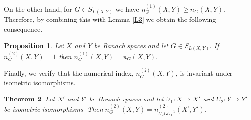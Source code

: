 \documentclass[12pt]{amsart}
\newtheorem{theorem}{Theorem}[section]
\newtheorem{proposition}[theorem]{Proposition}
\theoremstyle{definition}
\numberwithin{equation}{section}
\begin{document}
			
			
			
		
	
	
	On the other hand, for $G\in S_{ L(X, Y )}$ we have $n_G^{(1)}(X,Y)\ge n_G(X,Y).$ Therefore, by combining this with Lemma \ref{L3} we obtain the following consequence.
	
	\begin{proposition}
		Let $X$ and $Y$ be Banach spaces and let $G\in S_{ L(X, Y )}$. If $n_G^{(2)}(X,Y)=1$ then $n_G^{(1)}(X,Y)= n_G(X,Y).$
	\end{proposition}
	
	Finally, we verify that the numerical index, $n_G^{(2)}(X, Y)$, is invariant under isometric isomorphisms.
	
	\begin{theorem}
		Let $X'$ and $Y'$ be Banach spaces and let $U_1: X \to X'$ and $U_2: Y \to Y'$ be isometric isomorphisms. Then $n_G^{(2)}(X,Y) = n_{U_2GU_1^{-1}}^{(2)}(X',Y').$
	\end{theorem}
	
\end{document}
